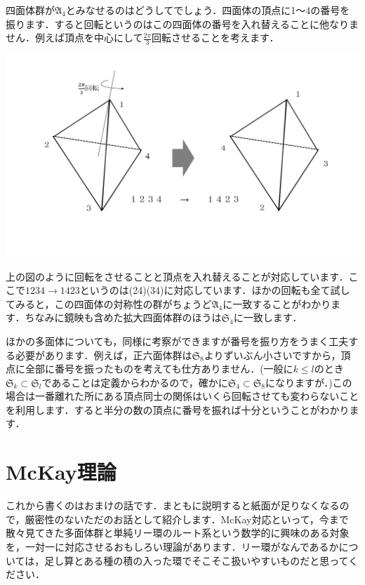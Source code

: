 \documentclass{jreport}
\theoremstyle{definition} %
\begin{document}
四面体群が$\mathfrak{A}_4$とみなせるのはどうしてでしょう．四面体の頂点に1～4の番号を振ります．すると回転というのはこの四面体の番号を入れ替えることに他なりません．例えば頂点を中心にして$\frac{2\pi}{3}$回転させることを考えます．

\includegraphics[width=15cm]{Inoue_image/i3.pdf}

上の図のように回転をさせることと頂点を入れ替えることが対応しています．ここで$1234\rightarrow1423$というのは(24)(34)に対応しています．ほかの回転も全て試してみると，この四面体の対称性の群がちょうど$\mathfrak{A}_4$に一致することがわかります．ちなみに鏡映も含めた拡大四面体群のほうは$\mathfrak{S}_4$に一致します．

ほかの多面体についても，同様に考察ができますが番号を振り方をうまく工夫する必要があります．例えば，正六面体群は$\mathfrak{S}_8$よりずいぶん小さいですから，頂点に全部に番号を振ったものを考えても仕方ありません．(一般に$k\leq l$のとき$\mathfrak{S}_k \subset \mathfrak{S}_l$であることは定義からわかるので，確かに$\mathfrak{S}_4 \subset \mathfrak{S}_8$になりますが．)この場合は一番離れた所にある頂点同士の関係はいくら回転させても変わらないことを利用します．すると半分の数の頂点に番号を振れば十分ということがわかります．

\section{McKay理論}%
これから書くのはおまけの話です．まともに説明すると紙面が足りなくなるので，厳密性のないただのお話として紹介します．McKay対応といって，今まで散々見てきた多面体群と単純リー環のルート系という数学的に興味のある対象を，一対一に対応させるおもしろい理論があります．リー環がなんであるかについては，足し算とある種の積の入った環でそこそこ扱いやすいものだと思ってください．
\end{document}
